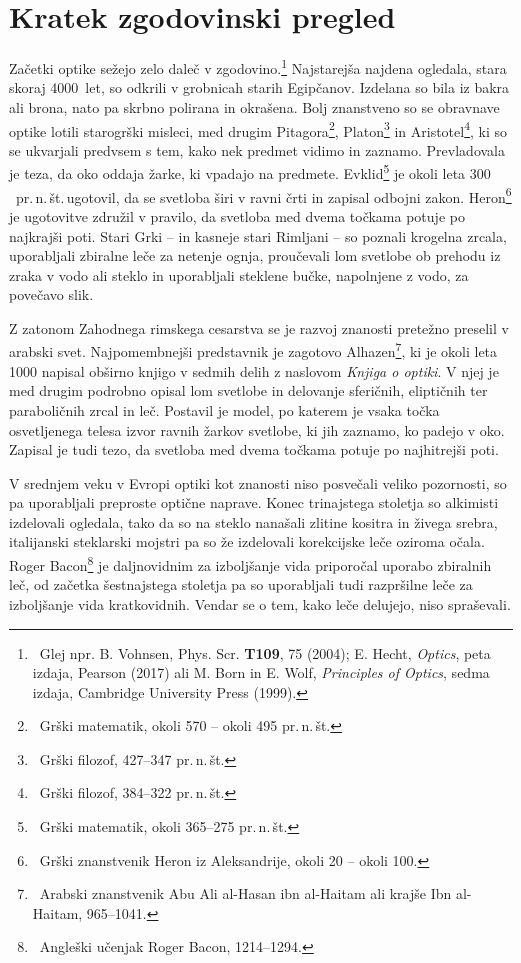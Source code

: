 \section{Kratek zgodovinski pregled}
Začetki optike sežejo zelo daleč v zgodovino.\footnote{~Glej 
npr. B. Vohnsen, Phys. Scr. {\bf T109}, 75 (2004); 
E. Hecht, {\it Optics}, peta izdaja, Pearson (2017) ali
M. Born in E. Wolf, {\it Principles of Optics}, sedma izdaja, 
Cambridge University Press (1999).} Najstarejša najdena ogledala, 
stara skoraj 4000~let, so odkrili v grobnicah starih Egipčanov. 
Izdelana so bila iz bakra ali brona, nato pa skrbno polirana in okrašena. 
Bolj znanstveno so se obravnave optike lotili starogrški
misleci, med drugim Pitagora\footnote{~Grški 
matematik, okoli 570 -- okoli 495 pr.\,n.\,št.}, Platon\footnote{~Grški 
filozof, 427--347 pr.\,n.\,št.} in Aristotel\footnote{~Grški 
filozof, 384--322 pr.\,n.\,št.}, ki so se
ukvarjali predvsem s tem, kako nek predmet vidimo in zaznamo. Prevladovala
je teza, da oko oddaja žarke, ki vpadajo na predmete.
Evklid\footnote{~Grški 
matematik, okoli 365--275 pr.\,n.\,št.} je okoli leta $300$~pr.\,n.\,št.\,ugotovil, 
da se svetloba širi v ravni črti in zapisal odbojni zakon. Heron\footnote{~Grški 
znanstvenik Heron iz Aleksandrije, okoli 20 -- okoli 100.} je ugotovitve združil
v pravilo, da svetloba med dvema točkama potuje po najkrajši poti.
Stari Grki -- in kasneje stari Rimljani -- so poznali krogelna zrcala, 
uporabljali zbiralne leče za netenje ognja, 
proučevali lom svetlobe ob prehodu iz zraka v vodo ali steklo
in uporabljali steklene bučke, napolnjene z vodo, za povečavo slik.

Z zatonom Zahodnega rimskega cesarstva se je razvoj znanosti pretežno 
preselil v arabski svet. Najpomembnejši predstavnik je zagotovo 
Alhazen\footnote{~Arabski znanstvenik Abu 
Ali al-Hasan ibn al-Haitam ali krajše Ibn al-Haitam, 965--1041.},
ki je okoli leta 1000 napisal obširno knjigo v sedmih delih
z naslovom {\it Knjiga o optiki}. 
V njej je med drugim podrobno opisal lom svetlobe in delovanje sferičnih,
eliptičnih ter paraboličnih zrcal in leč. Postavil je model, 
po katerem je vsaka točka osvetljenega telesa izvor
ravnih žarkov svetlobe, ki jih zaznamo, ko padejo v oko. 
Zapisal je tudi tezo, da svetloba med dvema točkama potuje po najhitrejši poti.

V srednjem veku v Evropi optiki kot znanosti niso posvečali veliko
pozornosti, so pa uporabljali preproste optične naprave. 
Konec trinajstega stoletja so alkimisti izdelovali ogledala, 
tako da so na steklo nanašali zlitine kositra in živega srebra, 
italijanski steklarski mojstri pa so že izdelovali korekcijske leče 
oziroma očala. Roger Bacon\footnote{~Angleški učenjak Roger Bacon, 1214--1294.}
je daljnovidnim za izboljšanje vida priporočal uporabo zbiralnih leč, 
od začetka šestnajstega stoletja pa so uporabljali tudi razpršilne leče
za izboljšanje vida kratkovidnih. Vendar se o tem, kako leče delujejo, 
niso spraševali. 

